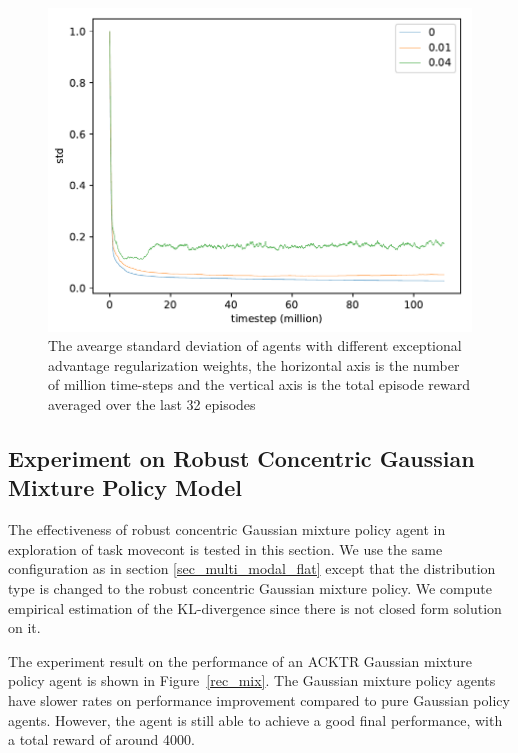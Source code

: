 \begin{figure}[!htbp]
	\includegraphics[width=\textwidth]{images/rec_180606_std_adv_reg.pdf}
	\centering
	\caption{The avearge standard deviation of agents with different exceptional advantage regularization weights, the horizontal axis is the number of million time-steps and the vertical axis is the total episode reward averaged over the last 32 episodes}\label{rec_std_adv_reg}
\end{figure}

\subsection{Experiment on Robust Concentric Gaussian Mixture Policy Model}
The effectiveness of robust concentric Gaussian mixture policy agent in exploration of task movecont is tested in this section. We use the same configuration as in section \ref{sec_multi_modal_flat} except that the distribution type is changed to the robust concentric Gaussian mixture policy. We compute empirical estimation of the KL-divergence since there is not closed form solution on it.

The experiment result on the performance of an ACKTR Gaussian mixture policy agent is shown in Figure~\ref{rec_mix}. The Gaussian mixture policy agents have slower rates on performance improvement compared to pure Gaussian policy agents. However, the agent is still able to achieve a good final performance, with a total reward of around 4000.

